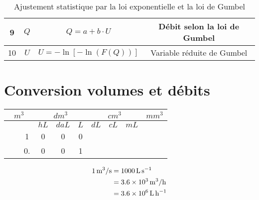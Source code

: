 \begin{table}[H]
\begin{tabular}{c|c|c|c}
        \hline
        9  & $Q$                                & $Q = a + b \cdot U$                                                                                                                       & Débit selon la loi de Gumbel \\
        \hline
        10 & $U$                                & $U = -\ln \left[ -\ln \left(F(Q)\right)\right]$                                                                                          & Variable réduite de Gumbel   \\
    \end{tabular}
    \caption{Ajustement statistique par la loi exponentielle et la loi de Gumbel}
    \label{tab:loiGumbelAjuste}
\end{table}

\section{Conversion volumes et débits}
\begin{table}[h!]
    \centering
    \begin{tabular}{|c|c|c|c|c|c|c|c|c|c|c|c|}
        \hline
        \multicolumn{3}{|c|}{\textbf{$m^3$}} & \multicolumn{3}{|c|}{\textbf{$dm^3$}} & \multicolumn{3}{|c|}{\textbf{$cm^3$}} & \multicolumn{3}{|c|}{\textbf{$mm^3$}} \\
        \hline
         & &                                 & $hL$ & $daL$ & $L$                    & $dL$ & $cL$ & $mL$                    & & & \\
        \hline \hline
         & &                               1 & 0    &   0   & 0                      & & &                                   & & & \\  
        \hline
         & &                               0. & 0    &   0   & 1                     & & &                                   & & & \\
        \hline
    \end{tabular}
\end{table}

\begin{align*}
    \qty{1}{\metre^3 \per\second} &= \qty{1000}{\litre\per\second}   \\
           &= \qty{3.6e3}{\metre^3 \per\hour} \\
           &= \qty{3.6e6}{\litre\per\hour} \\
\end{align*}
